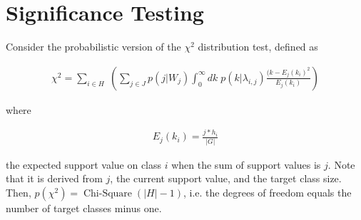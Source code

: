 \documentclass[a4paper,10pt]{article}
\begin{document}
\section{Significance Testing}
Consider the probabilistic version of the $\chi^2$ distribution test, defined as

\begin{align}
  \chi^2 = \sum_{i \in H}\; \left( \sum_{j \in J}p(j|W_j) \int_0^{\infty}dk\; p(k|\lambda_{i,j}) \frac{(k-E_j(k_i)^2}{E_j(k_i)} \right)
\end{align}

where 

\begin{align}
  E_j(k_i) = \frac{j * h_i}{\vert G\vert}
\end{align}

the expected support value on class $i$ when the sum of support values is $j$. Note that it is derived from $j$, the current support value, and the target class size. Then, $p(\chi^2)=\operatorname{Chi-Square}\left(\vert H\vert-1\right)$, i.e. the degrees of freedom equals the number of target classes minus one.
\end{document}

